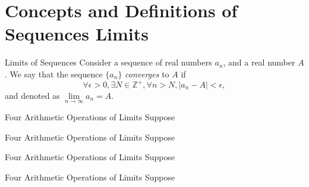 
\section{Concepts and Definitions of Sequences Limits}

\begin{definition}{Limits of Sequences}{}
  Consider a sequence of real numbers $a_n$, and a real number $A$.
  We say that the sequence $\{a_n\}$ \emph{converges} to $A$ if
  \begin{equation}
    \forall \epsilon > 0, \exists N \in \mathbb{Z}^+, \forall n > N, |a_n - A| < \epsilon,
  \end{equation}
  and denoted as $\lim \limits _{n \rightarrow \infty}a_n = A$.
\end{definition}

\begin{proposition}{Four Arithmetic Operations of Limits}{}
  Suppose 
\end{proposition}


\begin{theorem}{Four Arithmetic Operations of Limits}{}
  Suppose 
\end{theorem}

\begin{corollary}{Four Arithmetic Operations of Limits}{}
  Suppose 
\end{corollary}

\begin{lemma}{Four Arithmetic Operations of Limits}{}
  Suppose 
\end{lemma}



